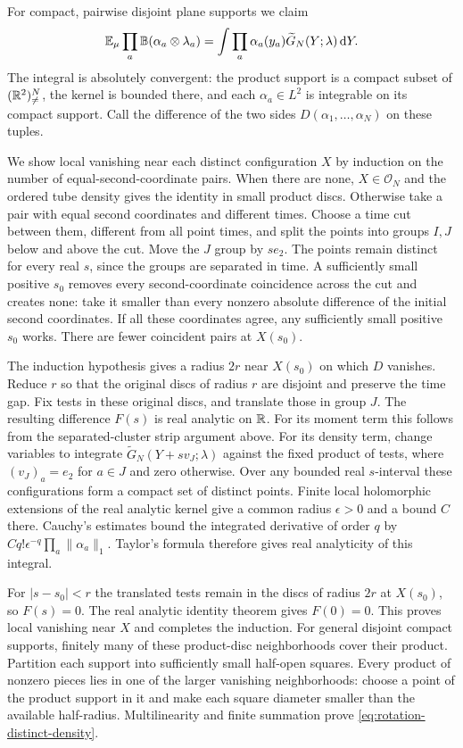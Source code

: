 For compact, pairwise disjoint plane supports we claim
\begin{equation}\label{eq:rotation-distinct-density}
 \mathbb E_\mu\prod_a\mathbb B(\alpha_a\otimes\lambda_a)
 =\int\prod_a\alpha_a(y_a)\widetilde G_N(Y;\lambda)\,\mathrm d Y.
\end{equation}
The integral is absolutely convergent: the product support
is a compact subset of $(\mathbb R^2)^N_{\ne}$, the kernel is bounded
there, and each $\alpha_a\in L^2$ is integrable on its compact
support.
Call the difference of the two sides $D(\alpha_1,\ldots,\alpha_N)$
on these tuples.

We show local vanishing near each distinct configuration $X$
by induction on the number of equal-second-coordinate pairs.
When there are none, $X\in\mathcal O_N$ and the ordered tube
density gives the identity in small product discs.
Otherwise take a pair with equal second coordinates and
different times. Choose a time cut between them, different
from all point times, and split the points into groups $I,J$
below and above the cut.
Move the $J$ group by $se_2$. The points remain distinct for
every real $s$, since the groups are separated in time.
A sufficiently small positive $s_0$ removes every
second-coordinate coincidence across the cut and creates none:
take it smaller than every nonzero absolute difference of the
initial second coordinates. If all these coordinates agree, any
sufficiently small positive $s_0$ works.
There are fewer coincident pairs at $X(s_0)$.

The induction hypothesis gives a radius $2r$ near $X(s_0)$
on which $D$ vanishes. Reduce $r$ so that the original discs
of radius $r$ are disjoint and preserve the time gap.
Fix tests in these original discs, and translate those in
group $J$. The resulting difference $F(s)$ is real analytic
on $\mathbb R$.
For its moment term this follows from the separated-cluster
strip argument above. For its density term, change variables
to integrate
$\widetilde G_N(Y+sv_J;\lambda)$ against the fixed product
of tests, where $(v_J)_a=e_2$ for $a\in J$ and zero otherwise.
Over any bounded real $s$-interval these configurations form
a compact set of distinct points. Finite local holomorphic
extensions of the real analytic kernel give a common radius
$\epsilon>0$ and a bound $C$ there. Cauchy's estimates bound
the integrated derivative of order $q$ by
$Cq!\epsilon^{-q}\prod_a\|\alpha_a\|_1$.
Taylor's formula therefore gives real analyticity of this
integral.

For $|s-s_0|<r$ the translated tests remain in the discs of
radius $2r$ at $X(s_0)$, so $F(s)=0$.
The real analytic identity theorem gives $F(0)=0$.
This proves local vanishing near $X$ and completes the induction.
For general disjoint compact supports, finitely many of these
product-disc neighborhoods cover their product.
Partition each support into sufficiently small half-open
squares. Every product of nonzero pieces lies in one of the
larger vanishing neighborhoods: choose a point of the
product support in it and make each square diameter smaller
than the available half-radius.
Multilinearity and finite summation prove
\eqref{eq:rotation-distinct-density}.


